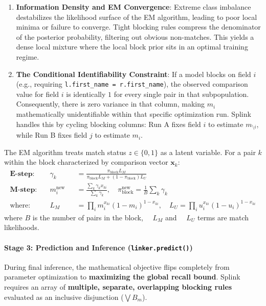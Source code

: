 \begin{enumerate}
	\item \textbf{Information Density and EM Convergence}: Extreme class imbalance destabilizes the likelihood surface of the EM algorithm, leading to poor local minima or failure to converge. Tight blocking rules compress the denominator of the posterior probability, filtering out obvious non-matches. This yields a dense local mixture where the local block prior sits in an optimal training regime.
	\item \textbf{The Conditional Identifiability Constraint}: If a model blocks on field $i$ (e.g., requiring \texttt{l.first\_name = r.first\_name}), the observed comparison value for field $i$ is identically $1$ for every single pair in that subpopulation. Consequently, there is zero variance in that column, making $m_i$ mathematically unidentifiable within that specific optimization run. Splink handles this by cycling blocking columns: Run A fixes field $i$ to estimate $m_{\setminus i}$, while Run B fixes field $j$ to estimate $m_i$.
\end{enumerate}

The EM algorithm treats match status $z \in \{0,1\}$ as a latent variable. For a pair $k$ within the block characterized by comparison vector $\mathbf{x}_k$:
\begin{align}
	\textbf{E-step:} & \quad \gamma_k         &  & = \frac{\pi_{\text{block}} L_M}{\pi_{\text{block}} L_M + (1-\pi_{\text{block}}) L_U}                                 \\[8pt]
	\textbf{M-step:} & \quad m_i^{\text{new}} &  & = \frac{\sum_k \gamma_k x_{ki}}{\sum_k \gamma_k}, \quad \pi_{\text{block}}^{\text{new}} = \frac{1}{B}\sum_k \gamma_k \\[8pt]
	\text{where:}    & \quad L_M              &  & = \prod_i m_i^{x_{ki}}(1-m_i)^{1-x_{ki}}, \quad L_U = \prod_i u_i^{x_{ki}}(1-u_i)^{1-x_{ki}}
\end{align}
where $B$ is the number of pairs in the block, $\quad L_M$ and $\quad L_U$ terms are match likelihoods.

\paragraph{Stage 3: Prediction and Inference (\texttt{linker.predict()})}
During final inference, the mathematical objective flips completely from parameter optimization to \textbf{maximizing the global recall bound}. Splink requires an array of \textbf{multiple, separate, overlapping blocking rules} evaluated as an inclusive disjunction ($\bigvee B_m$).


